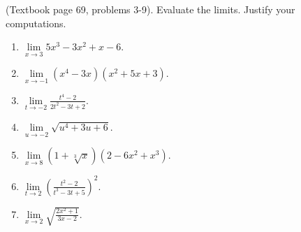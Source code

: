 \begin{problem}(Textbook page 69, problems 3-9). 
Evaluate the limits. Justify your computations.
\begin{multicols}{3}
\begin{enumerate}
\item $\displaystyle\lim\limits_{x\to 3} 5x^3-3x^2+x-6$.
\item $\displaystyle\lim\limits_{x\to -1} (x^4-3x)(x^2+5x+3)$.
\item $\displaystyle\lim\limits_{t\to -2}\frac{t^4-2}{2t^2-3t+2} $.
\item $\displaystyle\lim\limits_{u\to -2}\sqrt{u^4+3u +6}$.
\item $\displaystyle\lim\limits_{x \to 8}(1+\sqrt[3]{x})(2-6x^2+x^3)$.
\item $\displaystyle\lim\limits_{t \to 2}\left(\frac{t^2-2}{t^3-3t+5} \right)^2$.
\item $\displaystyle\lim\limits_{x\to 2}\sqrt{\frac{2x^2+1}{3x-2}}$.
\end{enumerate}
\end{multicols}
\end{problem}
